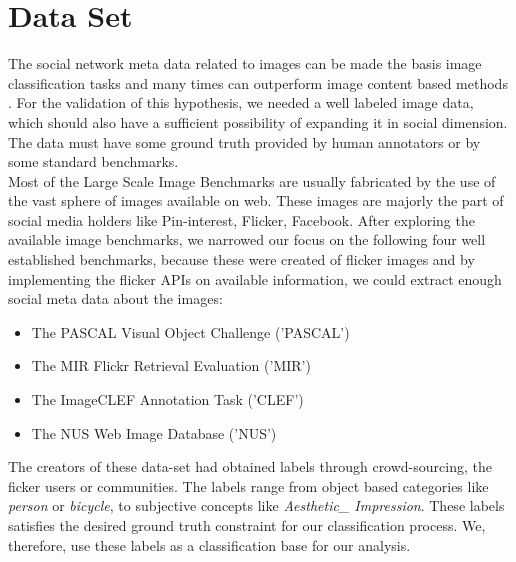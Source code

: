 
\chapter{Data Set} %

\label{Chapter3} %
The social network meta data related to images can be made the basis image classification tasks and many times can outperform image content based methods \cite{Jure}. For the validation of this hypothesis, we needed a well labeled image data, which should also have a sufficient possibility of expanding it in social dimension. The data must have some ground truth provided by human annotators or by some standard benchmarks.\\
\hspace*{1cm} Most of the Large Scale Image Benchmarks are usually fabricated by the use of the vast sphere of images available on web. These images are  majorly the part of social media holders like Pin-interest, Flicker, Facebook. After exploring the available image benchmarks, we narrowed our focus on the following four well established benchmarks, because these were created of flicker images and by implementing the flicker APIs on available information, we could extract enough social meta data about the images:\\
\begin{itemize}
\item The PASCAL Visual Object Challenge ('PASCAL') \cite{pascal} 
\item The MIR Flickr Retrieval Evaluation ('MIR')\cite{MIR}
\item The ImageCLEF Annotation Task ('CLEF')\cite{CLEF}
\item The NUS Web Image Database ('NUS')\cite{NUS} 
\end{itemize}
The creators of these data-set had obtained labels through crowd-sourcing, the ficker users  or communities. The labels range from object based categories like \textit{person} or \textit{bicycle}, to subjective concepts like \textit{Aesthetic\_ Impression}. These labels satisfies the desired ground truth constraint for our classification process. We, therefore, use these labels as a classification base for our analysis.\\
